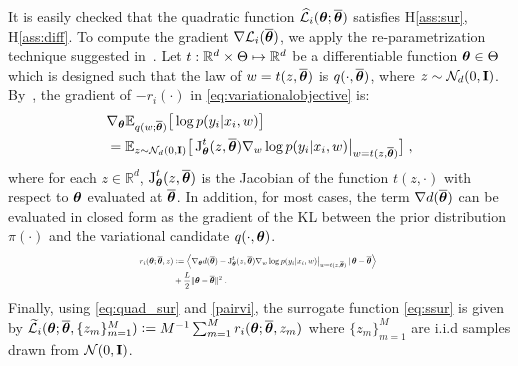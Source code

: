 \documentclass{article}
\begin{document}
It is easily checked that the quadratic function $\sur{i}{\param}{\op}$ satisfies H\ref{ass:sur}, H\ref{ass:diff}.
To compute the gradient $\nabla {\cal L}_i(\op)$, we apply the re-parametrization technique suggested in~\cite{paisley2013,kingma,blundell2015weight}.
Let $t: \rset^d \times \Param \mapsto \rset^d$ be a differentiable function \wrt $\param \in \Param$ which is designed such that the law of $w = t( z, \op )$ is $q(\cdot, \op )$, where $z \sim \mathcal{N}_d(0,\Id)$.
By~\cite[Proposition~1]{blundell2015weight}, the gradient of $-r_i(\cdot)$ in \eqref{eq:variationalobjective} is:
\begin{align}
&\nabla_{\param} \EE_{ q( w; \op )} \big[\log p(y_i| x_i, w)\big] \\\label{eq:vi_grad}
&=  \EE_{ z \sim \mathcal{N}_d(0,\Id) } \big[\jacob{\param}{t}{  z, \op}  \nabla_{w} \log p(y_i | x_i, w ) \big|_{w = t( z, \op )}\big] \eqsp, \notag
\end{align}
where for each $z \in \mathbb{R}^d$, $\jacob{\param}{t}{ z, \op }$ is the Jacobian of the function $t(z, \cdot)$ with respect to $\param$ evaluated at $\op$.
In addition, for most cases, the term $\grd d( \op )$ can be evaluated in closed form as the gradient of the KL between the prior distribution $\pi(\cdot)$ and the variational candidate $q(\cdot, \param )$.
\begin{equation}\label{pairvi}
\resizebox{.5\textwidth}{!}{%
$\begin{aligned}
\rsur{i}{\param}{\op}{z} & \eqdef  \pscal{ \grd_{\param} d(\op) - \jacob{\param}{t}{ z,\op}\nabla_w \log p(y_i | x_i, w)\big|_{w = t( z, \op )} } { \param - \op}\\
&  +\frac{L}{2}\| \param - \op\|^2 \eqsp.
\end{aligned}$
}
\end{equation}
Finally, using \eqref{eq:quad_sur} and \eqref{pairvi}, the surrogate function \eqref{eq:ssur} is given by $\ssur{i}{\param}{\op}{ \{ z_m \}_{m=1}^{M}} \eqdef M^{-1} \sum_{m=1}^{M} \rsur{i}{\param}{\op}{z_m}$
where $\{z_m\}_{m=1}^M$ are i.i.d samples drawn from $\mathcal{N}(0,\Id)$.
\end{document}
